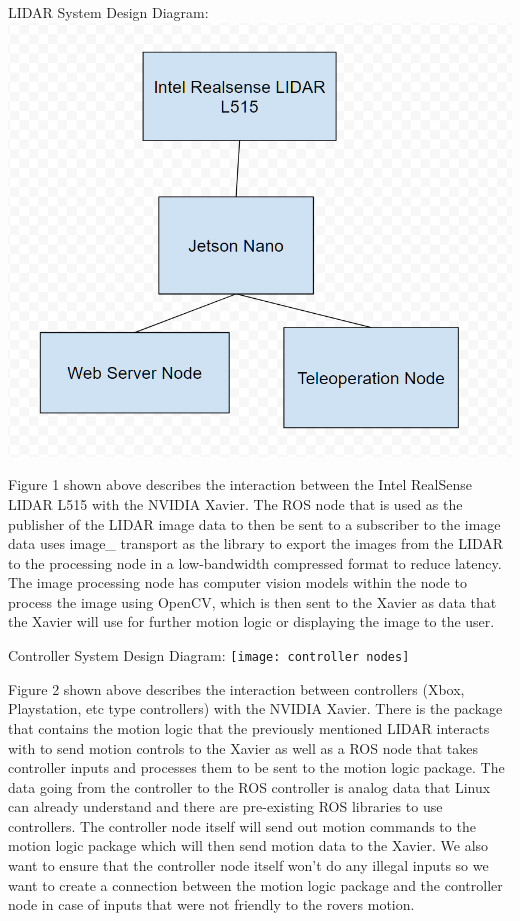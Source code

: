 \documentclass[a4paper, 10pt]{article}
\begin{document}
LIDAR System Design Diagram:
\includegraphics[scale=0.8]{LIDAR nodes}

Figure 1 shown above describes the interaction between the Intel RealSense LIDAR L515 with the NVIDIA Xavier. The ROS node that is used as the publisher of the LIDAR image data to then be sent to a subscriber to the image data uses image\_ transport as the library to export the images from the LIDAR to the processing node in a low-bandwidth compressed format to reduce latency. The image processing node has computer vision models within the node to process the image using OpenCV, which is then sent to the Xavier as data that the Xavier will use for further motion logic or displaying the image to the user.

Controller System Design Diagram:
\texttt{[image: controller nodes]}

Figure 2 shown above describes the interaction between controllers (Xbox, Playstation, etc type controllers) with the NVIDIA Xavier. There is the package that contains the motion logic that the previously mentioned LIDAR interacts with to send motion controls to the Xavier as well as a ROS node that takes controller inputs and processes them to be sent to the motion logic package. The data going from the controller to the ROS controller is analog data that Linux can already understand and there are pre-existing ROS libraries to use controllers. The controller node itself will send out motion commands to the motion logic package which will then send motion data to the Xavier. We also want to ensure that the controller node itself won't do any illegal inputs so we want to create a connection between the motion logic package and the controller node in case of inputs that were not friendly to the rovers motion.	
	
\end{document}

